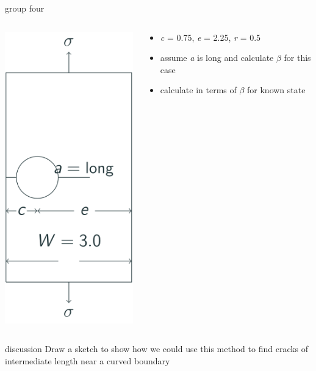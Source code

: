 \documentclass[
  letterpaper,
  ignorenonframetext,
  aspectratio=43,
  handout,
  12pt]{beamer}
\providecommand{\tightlist}{%
  \setlength{\itemsep}{0pt}\setlength{\parskip}{0pt}}
\providecommand{\tightlist}{%
\setlength{\itemsep}{0pt}\setlength{\parskip}{0pt}}
\let\Oldincludegraphics\includegraphics
\renewcommand{\includegraphics}[2][]{\Oldincludegraphics[width=\textwidth,height=0.7\textheight,keepaspectratio]{#2}}
\begin{document}
\begin{frame}{group four}
\protect\hypertarget{group-four}{}
\begin{columns}[T]
\begin{column}{0.5\textwidth}
\includegraphics{../images/curved-group4.svg}
\end{column}

\begin{column}{0.5\textwidth}
\begin{itemize}
\tightlist
\item
  \emph{c} = 0.75, \emph{e} = 2.25, \emph{r} = 0.5
\item
  assume \emph{a} is long and calculate \(\beta\) for this case
\item
  calculate in terms of \(\beta\) for known state
\end{itemize}
\end{column}
\end{columns}
\end{frame}

\begin{frame}{discussion}
\protect\hypertarget{discussion}{}
Draw a sketch to show how we could use this method to find cracks of
intermediate length near a curved boundary
\end{frame}
\end{document}
